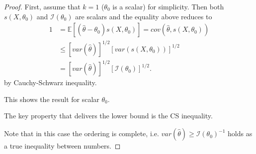 \documentclass[notes=show]{beamer}
\begin{document}
\begin{frame}%


\begin{proof}
First, assume that $k=1$ ($\theta _{0}$ is a scalar) for simplicity. Then
both $s\left( X,\theta _{0}\right) $ and $\mathcal{I}\left( \theta
_{0}\right) $ are scalars and the equality above reduces to%
\begin{align*}
1& =\mathbb{E}\left[ \left( \hat{\theta}-\theta _{0}\right) s\left( X,\theta
_{0}\right) \right] =cov\left( \hat{\theta},s\left( X,\theta _{0}\right)
\right) \\
& \leq \left[ var\left( \hat{\theta}\right) \right] ^{1/2}\left[ var\left(
s\left( X,\theta _{0}\right) \right) \right] ^{1/2} \\
& =\left[ var\left( \hat{\theta}\right) \right] ^{1/2}\left[ \mathcal{I}%
\left( \theta _{0}\right) \right] ^{1/2}.
\end{align*}%
by Cauchy-Schwarz inequality.

This shows the result for scalar $\theta _{0}$.

The key property that delivers the lower bound is the CS inequality.

Note that in this case the ordering is complete, i.e. $var\left( \hat{\theta}%
\right) \geq \mathcal{I}\left( \theta _{0}\right) ^{-1}$ holds as a true
inequality between numbers.
\end{proof}

\end{frame}%
\end{document}
